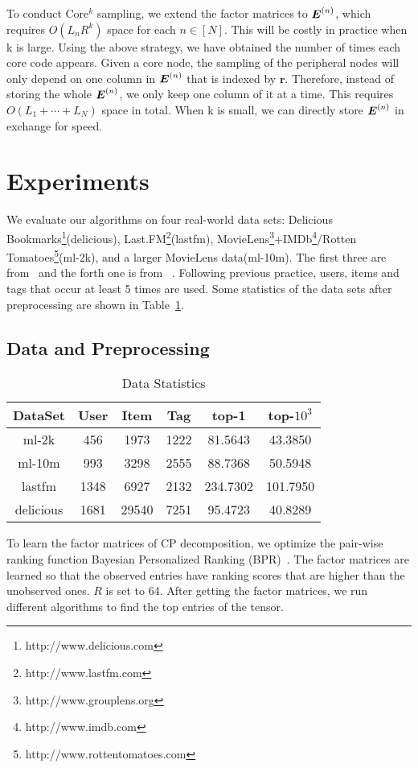 \documentclass[letterpaper]{article}
\newcommand{\M}[1]{{\boldsymbol{{\MakeUppercase{#1}}}}}
\newcommand{\FacMat}[2]{\M{#1}^{(#2)}}
\newcommand{\Table}[1]{Table~\ref{table:#1}}
\begin{document}
To conduct Core$^k$ sampling, 
we extend the factor matrices to $\FacMat{E}{n}$,
which requires $O(L_nR^k)$ space for each $n\in[N]$.
This will be costly in practice when k is large. 
Using the above strategy, we have obtained the number of times each core code appears. 
Given a core node, the sampling of the peripheral nodes 
will only depend on one column in $\FacMat{E}{n}$ that is indexed by $\boldsymbol{r}$. 
Therefore, instead of storing the whole $\FacMat{E}{n}$, 
we only keep one column of it at a time. 
This requires $O(L_1+\cdots+L_N)$ space in total.
When k is small, we can directly store $\FacMat{E}{n}$ in exchange for speed.
\section{Experiments}
%
%
%
%
%
We evaluate our algorithms on four real-world data sets:
Delicious Bookmarks\footnote{http://www.delicious.com}(delicious),
Last.FM\footnote{http://www.lastfm.com}(lastfm),
MovieLens\footnote{http://www.grouplens.org}+IMDb\footnote{http://www.imdb.com}/Rotten Tomatoes\footnote{http://www.rottentomatoes.com}(ml-2k),
and a larger MovieLens data(ml-10m). 
The first three are from~\cite{Cantador:RecSys2011} and the forth one is from ~\cite{Harper2015}.
Following previous practice, users, items and tags that occur at least 5 times are used. 
Some statistics of the data sets after preprocessing are shown in \Table{Data}.
\subsection{Data and Preprocessing}
\begin{table}[!]
  \centering
  \begin{tabular}{|c|c|c|c|c|c|}
    \hline
    DataSet     & User & Item    & Tag    & top-1   & top-$10^3$\\
    \hline
    ml-2k       & 456  &  1973   &  1222  & 81.5643  & 43.3850 \\
    ml-10m      & 993  &  3298   &  2555  & 88.7368 & 50.5948 \\
    lastfm      & 1348 &  6927   &  2132  & 234.7302 & 101.7950\\
    delicious   & 1681 &  29540  &  7251  & 95.4723  & 40.8289 \\
    \hline
  \end{tabular}
  \caption{Data Statistics}
  \label{table:Data}
\end{table}
To learn the factor matrices of CP decomposition, 
we optimize the pair-wise 
ranking function Bayesian Personalized Ranking (BPR)~\cite{Rendle_BPR,Rendle_RTF}.
The factor matrices are learned so that the observed entries have ranking scores that are higher than the unobserved ones. $R$ is set to 64. After getting the factor matrices, we run different algorithms to find the top entries of the tensor.
\end{document}
